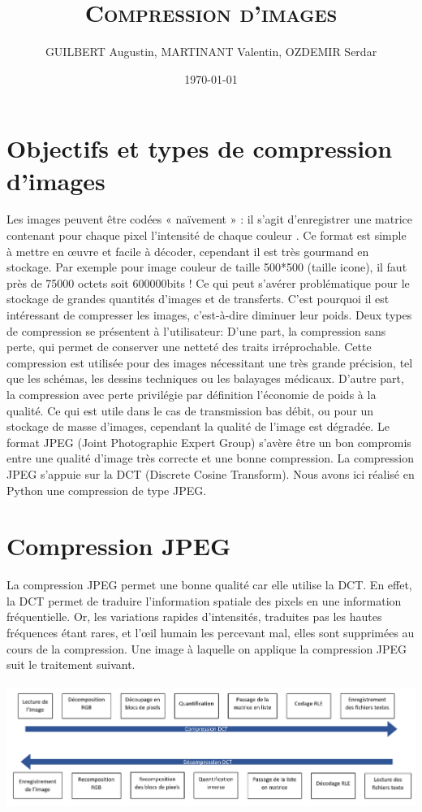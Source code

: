 \documentclass[12pt]{article}
\author{GUILBERT Augustin, MARTINANT Valentin, OZDEMIR Serdar}
\date{\today}
\title{\textsc{\textbf{Compression d'images}}}
\begin{document}
\maketitle
\newpage
\tableofcontents
\newpage
\section{Objectifs et types de compression d'images}	
Les images peuvent être codées « naïvement » : il s’agit d’enregistrer une matrice contenant pour chaque pixel l'intensité de chaque couleur . Ce format est simple à mettre en œuvre et facile à décoder, cependant il est très gourmand en stockage.  Par exemple pour image couleur de taille 500*500 (taille icone), il faut près de 75000 octets soit 600000bits ! Ce qui peut s’avérer problématique pour le stockage de grandes quantités d’images et de transferts. C’est pourquoi il est intéressant de compresser les images, c’est-à-dire diminuer leur poids. Deux types de compression se présentent à l’utilisateur:
D’une part, la compression sans perte, qui permet de conserver une netteté des traits irréprochable. Cette compression est utilisée pour des images nécessitant une très grande précision, tel que les schémas, les dessins techniques ou les balayages médicaux.
D’autre part, la compression avec perte privilégie par définition l’économie de poids à la qualité. Ce qui est utile dans le cas de transmission bas débit, ou pour un stockage de masse d’images, cependant la qualité de l’image est dégradée. Le format JPEG (Joint Photographic Expert Group) s’avère être un bon compromis entre une qualité d’image très correcte et une bonne compression. La compression JPEG s’appuie sur la DCT (Discrete Cosine Transform).
Nous avons ici réalisé en Python une compression de type JPEG.


\newpage
\section{Compression JPEG}
La compression JPEG permet une bonne qualité car elle utilise la DCT. En effet, la DCT permet de traduire l'information spatiale des pixels en une information fréquentielle. Or, les variations rapides d’intensités, traduites pas les hautes fréquences étant rares, et l’œil humain les percevant mal, elles sont supprimées au cours de la compression. Une image à laquelle on applique la compression JPEG suit le traitement suivant.
\paragraph{}
\begin{center}
\includegraphics[scale=0.2]{schema_dct_new.png} %
\end{center}
\end{document}
